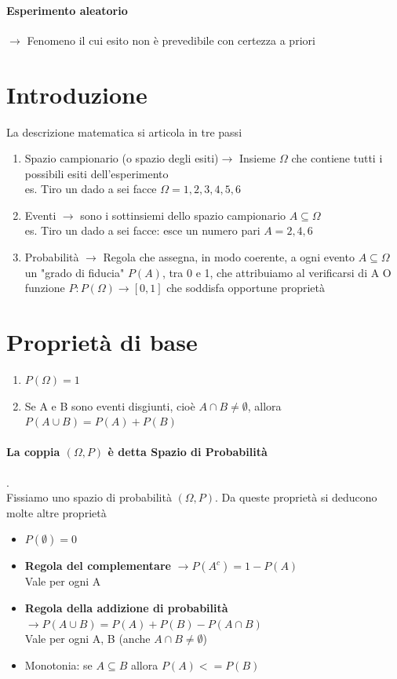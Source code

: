 \documentclass[12pt, a4paper, openany]{book}
\begin{document}
\paragraph{Esperimento aleatorio} $\to$ Fenomeno il cui esito non è prevedibile con certezza a priori
\section{Introduzione}
La descrizione matematica si articola in tre passi
\begin{enumerate}
    \item Spazio campionario (o spazio degli esiti)$\to$ Insieme $\Omega$ che contiene tutti i possibili esiti dell'esperimento \\ es. Tiro un dado a sei facce $\Omega = {1, 2, 3, 4, 5, 6}$
    \item Eventi $\to$ sono i sottinsiemi dello spazio campionario $A \subseteq \Omega$ \\ es. Tiro un dado a sei facce: esce un numero pari $A = {2, 4, 6}$
    \item Probabilità $\to$ Regola che assegna, in modo coerente, a ogni evento $A \subseteq \Omega$ un "grado di fiducia" $P(A)$, tra 0 e 1, che attribuiamo al verificarsi di A
    O funzione $P: P(\Omega) \to [0, 1]$ che soddisfa opportune proprietà
\end{enumerate}
\section{Proprietà di base} 
\begin{enumerate}
    \item $P(\Omega) = 1$
    \item Se A e B sono eventi disgiunti, cioè $A \cap B \neq \emptyset$, allora \\ $P (A \cup B) = P(A) + P(B)$
\end{enumerate}
\paragraph{La coppia $(\Omega, P)$ è detta \textbf{Spazio di Probabilità}}.
\\ Fissiamo uno spazio di probabilità $(\Omega, P)$.
Da queste proprietà si deducono molte altre proprietà
\begin{itemize}
    \item $P(\emptyset) = 0$
    \item \textbf{Regola del complementare} $\to P(A^c) = 1 - P(A)$ \\ Vale per ogni A
    \item \textbf{Regola della addizione di probabilità} $\to P(A \cup B) = P(A) + P(B) - P(A \cap B)$ 
    \\ Vale per ogni A, B (anche $A \cap B \neq \emptyset$)
    \item Monotonia: se $A \subseteq B$ allora $P(A) <= P(B)$
\end{itemize}
\end{document}
